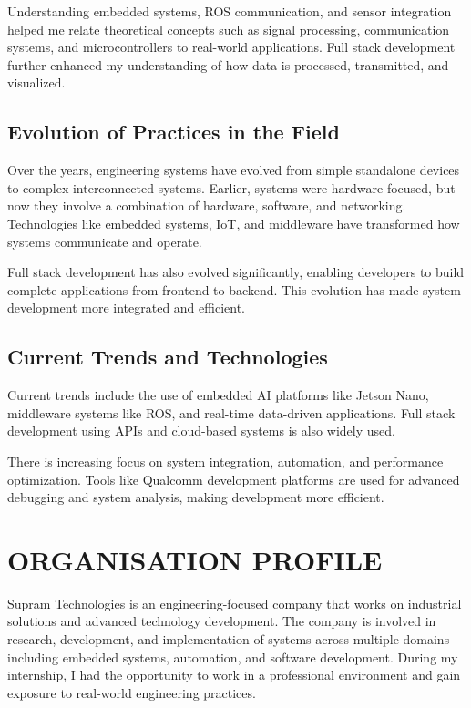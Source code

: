 \documentclass[12pt,a4paper]{report}
\begin{document}
Understanding embedded systems, ROS communication, and sensor integration helped me relate theoretical concepts such as signal processing, communication systems, and microcontrollers to real-world applications. Full stack development further enhanced my understanding of how data is processed, transmitted, and visualized.


\section{Evolution of Practices in the Field}

Over the years, engineering systems have evolved from simple standalone devices to complex interconnected systems. Earlier, systems were hardware-focused, but now they involve a combination of hardware, software, and networking. Technologies like embedded systems, IoT, and middleware have transformed how systems communicate and operate.


Full stack development has also evolved significantly, enabling developers to build complete applications from frontend to backend. This evolution has made system development more integrated and efficient.


\section{Current Trends and Technologies}

Current trends include the use of embedded AI platforms like Jetson Nano, middleware systems like ROS, and real-time data-driven applications. Full stack development using APIs and cloud-based systems is also widely used.


There is increasing focus on system integration, automation, and performance optimization. Tools like Qualcomm development platforms are used for advanced debugging and system analysis, making development more efficient.




\chapter{ORGANISATION PROFILE}
\label{ch:org}


Supram Technologies is an engineering-focused company that works on industrial solutions and advanced technology development. The company is involved in research, development, and implementation of systems across multiple domains including embedded systems, automation, and software development. During my internship, I had the opportunity to work in a professional environment and gain exposure to real-world engineering practices.
\end{document}
